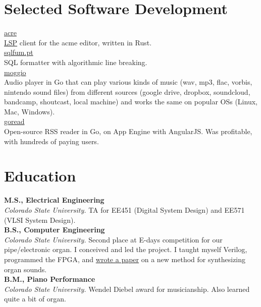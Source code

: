 \documentclass[10pt, a4paper]{article}
\newcommand{\years}[1]{\marginnote{\footnotesize #1}}
\begin{document}
\section*{Selected Software Development}

\href{https://github.com/mjibson/acre}{acre}\\\href{https://langserver.org/}{LSP} client for the acme editor, written in Rust.\\[.1cm]
\href{https://sqlfum.pt/}{sqlfum.pt}\\SQL formatter with algorithmic line breaking.\\[.1cm]
\href{https://github.com/mjibson/moggio}{moggio}\\Audio player in Go that can play various kinds of music (wav, mp3, flac, vorbis, nintendo sound files) from different sources (google drive, dropbox, soundcloud, bandcamp, shoutcast, local machine) and works the same on popular OSs (Linux, Mac, Windows).\\[.1cm]
\href{https://github.com/mjibson/goread}{goread}\\Open-source RSS reader in Go, on App Engine with AngularJS. Was profitable, with hundreds of paying users.\\[.1cm]

\section*{Education}

\noindent\years{2009}\textbf{M.S., Electrical Engineering}\\
\emph{Colorado State University.} TA for EE451 (Digital System Design) and EE571 (VLSI System Design).\\[.1cm]
\years{2007}\textbf{B.S., Computer Engineering}\\
\emph{Colorado State University.} Second place at E-days competition for our pipe/electronic organ. I conceived and led the project. I taught myself Verilog, programmed the FPGA, and \href{https://mattjibson.com/pubs/schalmei/schalmei.pdf}{wrote a paper} on a new method for synthesizing organ sounds.\\[.1cm]
\years{2007}\textbf{B.M., Piano Performance}\\
\emph{Colorado State University.} Wendel Diebel award for musicianship. Also learned quite a bit of organ.
\end{document}
